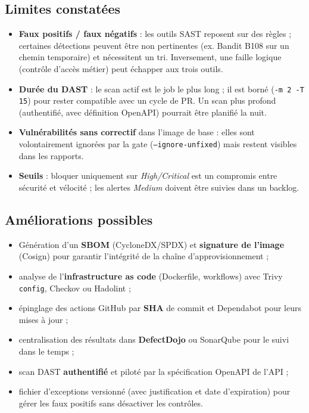 \documentclass[11pt,a4paper]{article}
\begin{document}
\subsection{Limites constatées}
\begin{itemize}[itemsep=2pt]
  \item \textbf{Faux positifs / faux négatifs} : les outils SAST reposent sur des règles ; certaines
        détections peuvent être non pertinentes (ex. Bandit B108 sur un chemin temporaire) et
        nécessitent un tri. Inversement, une faille logique (contrôle d'accès métier) peut échapper
        aux trois outils.
  \item \textbf{Durée du DAST} : le scan actif est le job le plus long ; il est borné
        (\texttt{-m 2 -T 15}) pour rester compatible avec un cycle de PR. Un scan plus profond
        (authentifié, avec définition OpenAPI) pourrait être planifié la nuit.
  \item \textbf{Vulnérabilités sans correctif} dans l'image de base : elles sont volontairement
        ignorées par la gate (\texttt{--ignore-unfixed}) mais restent visibles dans les rapports.
  \item \textbf{Seuils} : bloquer uniquement sur \emph{High/Critical} est un compromis entre sécurité
        et vélocité ; les alertes \emph{Medium} doivent être suivies dans un backlog.
\end{itemize}

\subsection{Améliorations possibles}
\begin{itemize}[itemsep=2pt]
  \item Génération d'un \textbf{SBOM} (CycloneDX/SPDX) et \textbf{signature de l'image} (Cosign)
        pour garantir l'intégrité de la chaîne d'approvisionnement ;
  \item analyse de l'\textbf{infrastructure as code} (Dockerfile, workflows) avec Trivy
        \texttt{config}, Checkov ou Hadolint ;
  \item épinglage des actions GitHub par \textbf{SHA} de commit et Dependabot pour leurs mises à jour ;
  \item centralisation des résultats dans \textbf{DefectDojo} ou SonarQube pour le suivi dans le temps ;
  \item scan DAST \textbf{authentifié} et piloté par la spécification OpenAPI de l'API ;
  \item fichier d'exceptions versionné (avec justification et date d'expiration) pour gérer les
        faux positifs sans désactiver les contrôles.
\end{itemize}
\end{document}
